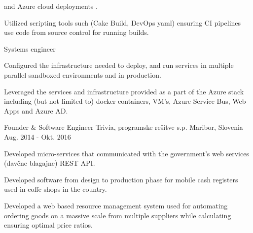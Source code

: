 \begin{cventries}
{\begin{cvitems}
{         and Azure cloud deployments .}
        \item {Utilized scripting tools such (Cake Build, DevOps yaml) 
        ensuring CI pipelines use code from source control for running builds.\\}
      \end{cvitems}
    }
    \cventry
    {Systems engineer} %
    {} %
    {} %
    {} %
    {
      \begin{cvitems} %
        \item {Configured the infrastructure needed to deploy, 
        and run services in multiple parallel sandboxed environments 
        and in production.}
        \item {Leveraged the services and infrastructure provided as a
         part of the Azure stack including (but not limited to) 
         docker containers, VM's, Azure Service Bus, Web Apps and Azure AD.\\}
      \end{cvitems}
    }

  \cventry
    {Founder \& Software Engineer} %
    {Trivia, programske rešitve s.p.} %
    {Maribor, Slovenia} %
    {Aug. 2014 - Okt. 2016} %
    {
      \begin{cvitems} %
        \item {Developed micro-services that communicated with the 
        government's web services (davčne blagajne) REST API.}
        \item {Developed software from design to production phase for 
        mobile cash registers used in coffe shops in the country.}
        \item {Developed a web based resource management system used 
        for automating ordering goods on a massive scale from multiple 
        suppliers while calculating ensuring optimal price ratios.}
      \end{cvitems}
    }

\end{cventries}
